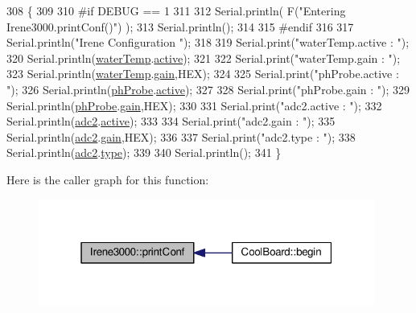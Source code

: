 \begin{DoxyCode}
308 \{
309 
310 \textcolor{preprocessor}{#if DEBUG == 1 }
311 
312     Serial.println( F(\textcolor{stringliteral}{"Entering Irene3000.printConf()"}) );
313     Serial.println();
314 
315 \textcolor{preprocessor}{#endif }
316 
317     Serial.println(\textcolor{stringliteral}{"Irene Configuration "});
318 
319     Serial.print(\textcolor{stringliteral}{"waterTemp.active : "});
320     Serial.println(\hyperlink{classIrene3000_af05612c78c758ce9db316c75ad937130}{waterTemp}.\hyperlink{structIrene3000_1_1state_af7ff649f20b9a2fb6ca0f949ee9a25ce}{active});
321 
322     Serial.print(\textcolor{stringliteral}{"waterTemp.gain : "});
323     Serial.println(\hyperlink{classIrene3000_af05612c78c758ce9db316c75ad937130}{waterTemp}.\hyperlink{structIrene3000_1_1state_a1ecf69d38cb31ecaf6b3602a3f3e93cb}{gain},HEX);    
324 
325     Serial.print(\textcolor{stringliteral}{"phProbe.active : "});
326     Serial.println(\hyperlink{classIrene3000_a997a4ee466fa1d5416e07e444965dc9e}{phProbe}.\hyperlink{structIrene3000_1_1state_af7ff649f20b9a2fb6ca0f949ee9a25ce}{active});
327 
328     Serial.print(\textcolor{stringliteral}{"phProbe.gain : "});
329     Serial.println(\hyperlink{classIrene3000_a997a4ee466fa1d5416e07e444965dc9e}{phProbe}.\hyperlink{structIrene3000_1_1state_a1ecf69d38cb31ecaf6b3602a3f3e93cb}{gain},HEX);
330     
331     Serial.print(\textcolor{stringliteral}{"adc2.active : "});
332     Serial.println(\hyperlink{classIrene3000_aae3a95a1c83c766cd2f299ce471c337e}{adc2}.\hyperlink{structIrene3000_1_1state_af7ff649f20b9a2fb6ca0f949ee9a25ce}{active});
333 
334     Serial.print(\textcolor{stringliteral}{"adc2.gain : "});
335     Serial.println(\hyperlink{classIrene3000_aae3a95a1c83c766cd2f299ce471c337e}{adc2}.\hyperlink{structIrene3000_1_1state_a1ecf69d38cb31ecaf6b3602a3f3e93cb}{gain},HEX);
336 
337     Serial.print(\textcolor{stringliteral}{"adc2.type : "});
338     Serial.println(\hyperlink{classIrene3000_aae3a95a1c83c766cd2f299ce471c337e}{adc2}.\hyperlink{structIrene3000_1_1state_a9897a7e02727db6351d44006eec73799}{type});
339 
340     Serial.println();
341 \}
\end{DoxyCode}
Here is the caller graph for this function\+:\nopagebreak
\begin{figure}[H]
\begin{center}
\leavevmode
\includegraphics[width=313pt]{classIrene3000_a7bc2414100b5e19eacc6630fa34b2654_icgraph}
\end{center}
\end{figure}
\mbox{\label{classIrene3000_a852a170feea994ea1df01c6b245b5d9a}} 
